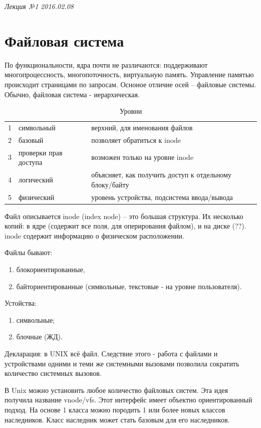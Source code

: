 \clearpage
\begin{flushright}
	\textit{Лекция №1}
	\textit{2016.02.08}
\end{flushright}

\chapter{Файловая система}
По функциональности, ядра почти не различаются: поддерживают многопроцессность, многопоточность, виртуальную память. Управление памятью происходит страницами по запросам. Осноное отличие осей – файловые системы. Обычно, файловая система - иерархическая.

\begin{table}[H]
\caption{Уровни}
\begin{tabular}{|l|l|l|}
\hline
1 & символьный & верхний, для именования файлов\\
2 & базовый & позволяет обратиться к inode\\
3 & проверки прав доступа & возможен только на уровне inode\\
4 & логический & объясняет, как получить доступ к отдельному  блоку/байту\\
5 & физический & уровень устройства, подсистема ввода/вывода\\
\hline
\end{tabular}
\end{table}

Файл описывается inode (index node) – это большая структура. Их несколько копий: в ядре (содержит все поля, для оперирования файлом), и на диске (??). inode содержит информацию о физическом расположении.

Файлы бывают:
\begin{enumerate}
\item блокориентированные,
\item байториентированные (символьные, текстовые - на уровне пользователя).
\end{enumerate}

Устойства:
\begin{enumerate}
\item символьные;
\item блочные (ЖД).
\end{enumerate}

Декларация: в UNIX всё файл. Следствие этого - работа с файлами и устройствами одними и теми же системными вызовами позволила сократить количество системных вызовов.

В Unix можно установить любое количество файловых систем. Эта идея получила название vnode/vfs. Этот интерфейс имеет объектно ориентированный подход. На основе 1 класса можно породить 1 или более новых классов наследников. Класс наследник может стать базовым для его наследников.

